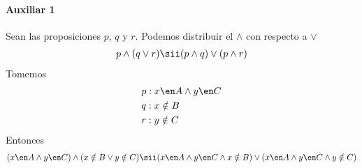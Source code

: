 \begin{enumerate}[label=\roman*)]
        \paragraph{Auxiliar 1}{
          Sean las proposiciones $p$, $q$ y $r$. Podemos distribuir el $\land$ con respecto a $\lor$
          \begin{align*}
            p \land (q \lor r) \sii (p \land q) \lor (p \land r)
          \end{align*}
          Tomemos
          \begin{align*}
             & p: x \en A \land y \en C \\
             & q: x \notin B            \\
             & r: y \notin C
          \end{align*}
          Entonces
          \begin{align*}
            (x \en A \land y \en C) \land (x \notin B \lor y \notin C) \sii
            (x \en A \land y \en C \land x \notin B) \lor (x \en A \land y \en C \land y \notin C)
          \end{align*}
        }

\end{enumerate}
